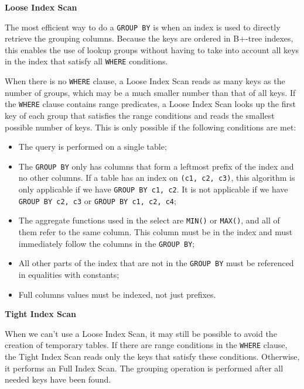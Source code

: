 \documentclass[12pt]{article}
\begin{document}
\noindent \textbf{Loose Index Scan} 

The most efficient way to do a \verb|GROUP BY| is when an index is used to directly retrieve the grouping columns. Because the keys are ordered in B+-tree indexes, this enables the use of lookup groups without having to take into account all keys in the index that satisfy all \verb|WHERE| conditions. 

When there is no \verb|WHERE| clause, a Loose Index Scan reads as many keys as the number of groups, which may be a much smaller number than that of all keys. If the \verb|WHERE| clause contains range predicates, a Loose Index Scan looks up the first key of each group that satisfies the range conditions and reads the smallest possible number of keys. This is only possible if the following conditions are met:

\begin{itemize}
    \item The query is performed on a single table;

    \item The \verb|GROUP BY| only has columns that form a leftmost prefix of the index and no other columns. If a table has an index on \verb|(c1, c2, c3)|, this algorithm is only applicable if we have \verb|GROUP BY c1, c2|. It is not applicable if we have \verb|GROUP BY c2, c3| or \verb|GROUP BY c1, c2, c4|;

    \item The aggregate functions used in the select are \verb|MIN()| or \verb|MAX()|, and all of them refer to the same column. This column must be in the index and must immediately follow the columns in the \verb|GROUP BY|;

    \item All other parts of the index that are not in the \verb|GROUP BY| must be referenced in equalities with constants;

    \item Full columns values must be indexed, not just prefixes. 
\end{itemize}

\vspace{0.3cm}
\noindent \textbf{Tight Index Scan} 

When we can't use a Loose Index Scan, it may still be possible to avoid the creation of temporary tables. If there are range conditions in the \verb|WHERE| clause, the Tight Index Scan reads only the keys that satisfy these conditions. Otherwise, it performs an Full Index Scan. The grouping operation is performed after all needed keys have been found.
\end{document}
